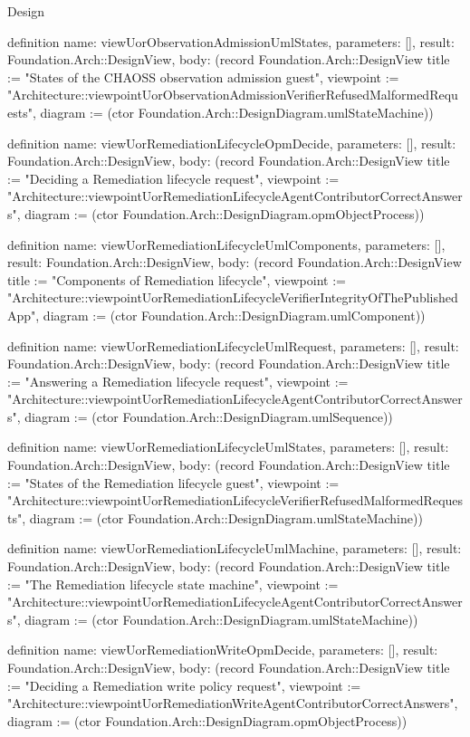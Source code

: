 \begin{lexlean}{Design}
\begin{semanticmodule}
definition{
  name: viewUorObservationAdmissionUmlStates,
  parameters: [],
  result: Foundation.Arch::DesignView,
  body: (record Foundation.Arch::DesignView {title := "States of the CHAOSS observation admission guest", viewpoint := "Architecture::viewpointUorObservationAdmissionVerifierRefusedMalformedRequests", diagram := (ctor Foundation.Arch::DesignDiagram.umlStateMachine)})
}

definition{
  name: viewUorRemediationLifecycleOpmDecide,
  parameters: [],
  result: Foundation.Arch::DesignView,
  body: (record Foundation.Arch::DesignView {title := "Deciding a Remediation lifecycle request", viewpoint := "Architecture::viewpointUorRemediationLifecycleAgentContributorCorrectAnswers", diagram := (ctor Foundation.Arch::DesignDiagram.opmObjectProcess)})
}

definition{
  name: viewUorRemediationLifecycleUmlComponents,
  parameters: [],
  result: Foundation.Arch::DesignView,
  body: (record Foundation.Arch::DesignView {title := "Components of Remediation lifecycle", viewpoint := "Architecture::viewpointUorRemediationLifecycleVerifierIntegrityOfThePublishedApp", diagram := (ctor Foundation.Arch::DesignDiagram.umlComponent)})
}

definition{
  name: viewUorRemediationLifecycleUmlRequest,
  parameters: [],
  result: Foundation.Arch::DesignView,
  body: (record Foundation.Arch::DesignView {title := "Answering a Remediation lifecycle request", viewpoint := "Architecture::viewpointUorRemediationLifecycleAgentContributorCorrectAnswers", diagram := (ctor Foundation.Arch::DesignDiagram.umlSequence)})
}

definition{
  name: viewUorRemediationLifecycleUmlStates,
  parameters: [],
  result: Foundation.Arch::DesignView,
  body: (record Foundation.Arch::DesignView {title := "States of the Remediation lifecycle guest", viewpoint := "Architecture::viewpointUorRemediationLifecycleVerifierRefusedMalformedRequests", diagram := (ctor Foundation.Arch::DesignDiagram.umlStateMachine)})
}

definition{
  name: viewUorRemediationLifecycleUmlMachine,
  parameters: [],
  result: Foundation.Arch::DesignView,
  body: (record Foundation.Arch::DesignView {title := "The Remediation lifecycle state machine", viewpoint := "Architecture::viewpointUorRemediationLifecycleAgentContributorCorrectAnswers", diagram := (ctor Foundation.Arch::DesignDiagram.umlStateMachine)})
}

definition{
  name: viewUorRemediationWriteOpmDecide,
  parameters: [],
  result: Foundation.Arch::DesignView,
  body: (record Foundation.Arch::DesignView {title := "Deciding a Remediation write policy request", viewpoint := "Architecture::viewpointUorRemediationWriteAgentContributorCorrectAnswers", diagram := (ctor Foundation.Arch::DesignDiagram.opmObjectProcess)})
}


\end{semanticmodule}
\end{lexlean}
